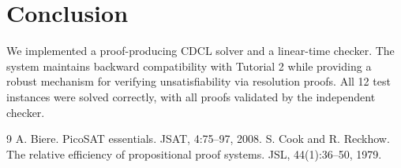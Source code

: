 \documentclass{article}
\begin{document}
\section{Conclusion}

We implemented a proof-producing CDCL solver and a linear-time checker.
The system maintains backward compatibility with Tutorial 2 while
providing a robust mechanism for verifying unsatisfiability via
resolution proofs.
All 12 test instances were solved correctly, with all proofs validated
by the independent checker.

\begin{thebibliography}{9}
 A. Biere. PicoSAT essentials. JSAT, 4:75--97, 2008.
 S. Cook and R. Reckhow. The relative efficiency of propositional proof systems. JSL, 44(1):36--50, 1979.
\end{thebibliography}
\end{document}
